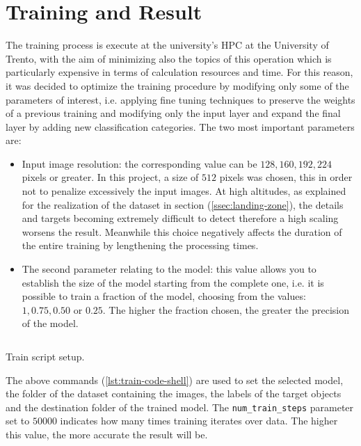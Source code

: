 \section{Training and Result}
\label{sec:training-result}
%
The training process is execute at the university's HPC at the University of
Trento, with the aim of minimizing also the topics of this operation which is
particularly expensive in terms of calculation resources and time.
For this reason, it was decided to optimize the training procedure by modifying
only some of the parameters of interest, i.e. applying fine tuning techniques to
preserve the weights of a previous training and modifying only the input
layer and expand the final layer by adding new classification categories. 
The two most important parameters are:
\begin{itemize}
	\item Input image resolution: the corresponding value can be $128, 160, 192,
224$ pixels or greater. In this project, a size of $512$ pixels was chosen, this
in order not to penalize excessively the input images. At high altitudes, as
explained for the realization of the dataset in section (\ref{ssec:landing-zone}),
the details and targets becoming extremely difficult to detect therefore a high
scaling worsens the result. Meanwhile this choice negatively affects the
duration of the entire training by lengthening the processing times.
	\item The second parameter relating to the model: this value allows you to
establish the size of the model starting from the complete one, i.e. it is
possible to train a fraction of the model, choosing from the values: $1, 0.75,
0.50$ or $0.25$. The higher the fraction chosen, the greater the precision of
the model.
\end{itemize}
%
\begin{listing}[ht] 
\inputminted[frame=lines,framesep=2mm, linenos=true, autogobble, breaklines=true, fontsize=\scriptsize, firstline=25, lastline=38]{shell}{neuralnetworks/code/train_ssd_mobilenet_v2_coco_2018_03_29.sh} 
\caption{Train script setup.} 
\label{lst:train-code-shell} 
\end{listing}
%
The above commands (\ref{lst:train-code-shell}) are used to set the selected
model, the folder of the dataset containing the images, the labels of the target
objects and the destination folder of the trained model.
The \texttt{num\_train\_steps} parameter set to $50000$ indicates how many times
training iterates over data. The higher this value, the more accurate the result
will be.
%

